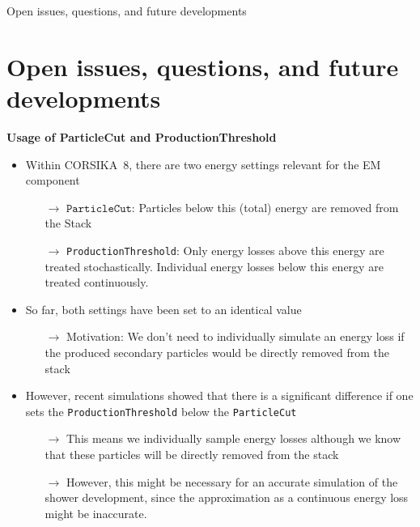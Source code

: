 \documentclass[aspectratio=1610, 9pt]{beamer}
\begin{document}
\begin{frame}
  \begin{center}
    \Huge Open issues, questions, and future developments
  \end{center}
\end{frame}

\section{Open issues, questions, and future developments}


\begin{frame}

  \textbf{Usage of ParticleCut and ProductionThreshold}

  \begin{itemize}
    \item Within CORSIKA~8, there are two energy settings relevant for the EM component
    \begin{itemize}
      \item[$\rightarrow$] $\texttt{ParticleCut}$: Particles below this (total) energy are removed from the Stack
      \item[$\rightarrow$] \texttt{ProductionThreshold}: Only energy losses above this energy are treated stochastically. Individual energy losses below this energy are treated continuously.
    \end{itemize}
    \item So far, both settings have been set to an identical value
    \begin{itemize}
      \item[$\rightarrow$] Motivation: We don't need to individually simulate an energy loss if the produced secondary particles would be directly removed from the stack
    \end{itemize}
    \item However, recent simulations showed that there is a significant difference if one sets the \texttt{ProductionThreshold} below the \texttt{ParticleCut}
    \begin{itemize}
      \item[$\rightarrow$] This means we individually sample energy losses although we know that these particles will be directly removed from the stack
      \item[$\rightarrow$] However, this might be necessary for an accurate simulation of the shower development, since the approximation as a continuous energy loss might be inaccurate.
    \end{itemize}
  \end{itemize}
\end{frame}
\end{document}
